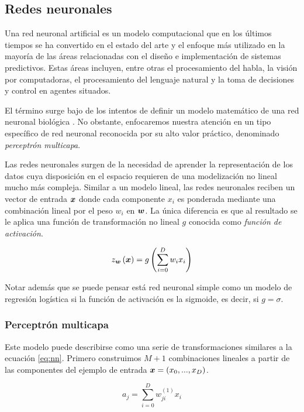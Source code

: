 \subsection{Redes neuronales}

Una red neuronal artificial es un modelo computacional que en los últimos
tiempos se ha convertido en el estado del arte y el enfoque más utilizado en la
mayoría de las áreas relacionadas con el diseño e implementación de sistemas
predictivos. Estas áreas incluyen, entre otras el procesamiento del habla, la
visión por computadoras, el procesamiento del lenguaje natural y la toma de
decisiones y control en agentes situados.

El término surge bajo de los intentos de definir un modelo matemático de una red
neuronal biológica \citep{McCulloch-Pitts-1990}. No obstante, enfocaremos
nuestra atención en un tipo específico de red neuronal reconocida por su alto
valor práctico, denominado \emph{perceptrón multicapa}.

Las redes neuronales surgen de la necesidad de aprender la representación de los
datos cuya disposición en el espacio requieren de una modelización no lineal
mucho más compleja. Similar a un modelo lineal, las redes neuronales reciben un
vector de entrada $\boldsymbol{x}$ donde cada componente $x_i$ es ponderada mediante
una combinación lineal por el peso $w_i$ en $\boldsymbol{w}$. La única diferencia es
que al resultado se le aplica una función de transformación no lineal $g$
conocida como \emph{función de activación}.

\begin{equation} \label{eq:nn}
    z_{\boldsymbol{w}}\left( \boldsymbol{x} \right) = g\left( \sum_{i=0}^{D} w_i x_i \right)
\end{equation}

Notar además que se puede pensar está red neuronal simple como un modelo de
regresión logística si la función de activación es la sigmoide, es decir, si $g
= \sigma$.

\subsubsection{Perceptrón multicapa}
\label{subch:multi_layer_perceptron}

Este modelo puede describirse como una serie de transformaciones similares a la
ecuación \ref{eq:nn}. Primero construimos $M + 1$ combinaciones lineales a
partir de las componentes del ejemplo de entrada $\boldsymbol{x} = (x_0, ..., x_D)$.

\begin{equation}
    a_j = \sum_{i = 0}^{D} w_{ji}^{(1)} x_{i}
\end{equation}

